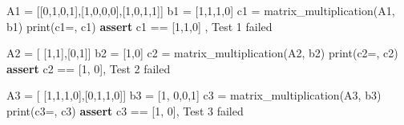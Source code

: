 \documentclass[
]{article}
\newenvironment{Shaded}{}{}
\newcommand{\BuiltInTok}[1]{\textcolor[rgb]{0.00,0.50,0.00}{#1}}
\newcommand{\ControlFlowTok}[1]{\textcolor[rgb]{0.00,0.44,0.13}{\textbf{#1}}}
\newcommand{\DecValTok}[1]{\textcolor[rgb]{0.25,0.63,0.44}{#1}}
\newcommand{\NormalTok}[1]{#1}
\newcommand{\OperatorTok}[1]{\textcolor[rgb]{0.40,0.40,0.40}{#1}}
\newcommand{\StringTok}[1]{\textcolor[rgb]{0.25,0.44,0.63}{#1}}
\begin{document}
\begin{Shaded}
\begin{Highlighting}[]
\NormalTok{A1 }\OperatorTok{=}\NormalTok{ [[}\DecValTok{0}\NormalTok{,}\DecValTok{1}\NormalTok{,}\DecValTok{0}\NormalTok{,}\DecValTok{1}\NormalTok{],[}\DecValTok{1}\NormalTok{,}\DecValTok{0}\NormalTok{,}\DecValTok{0}\NormalTok{,}\DecValTok{0}\NormalTok{],[}\DecValTok{1}\NormalTok{,}\DecValTok{0}\NormalTok{,}\DecValTok{1}\NormalTok{,}\DecValTok{1}\NormalTok{]]}
\NormalTok{b1 }\OperatorTok{=}\NormalTok{ [}\DecValTok{1}\NormalTok{,}\DecValTok{1}\NormalTok{,}\DecValTok{1}\NormalTok{,}\DecValTok{0}\NormalTok{]}
\NormalTok{c1 }\OperatorTok{=}\NormalTok{ matrix\_multiplication(A1, b1)}
\BuiltInTok{print}\NormalTok{(}\StringTok{\textquotesingle{}c1=\textquotesingle{}}\NormalTok{, c1)}
\ControlFlowTok{assert}\NormalTok{ c1 }\OperatorTok{==}\NormalTok{ [}\DecValTok{1}\NormalTok{,}\DecValTok{1}\NormalTok{,}\DecValTok{0}\NormalTok{] , }\StringTok{\textquotesingle{}Test 1 failed\textquotesingle{}}

\NormalTok{A2 }\OperatorTok{=}\NormalTok{ [ [}\DecValTok{1}\NormalTok{,}\DecValTok{1}\NormalTok{],[}\DecValTok{0}\NormalTok{,}\DecValTok{1}\NormalTok{]]}
\NormalTok{b2 }\OperatorTok{=}\NormalTok{ [}\DecValTok{1}\NormalTok{,}\DecValTok{0}\NormalTok{]}
\NormalTok{c2 }\OperatorTok{=}\NormalTok{ matrix\_multiplication(A2, b2)}
\BuiltInTok{print}\NormalTok{(}\StringTok{\textquotesingle{}c2=\textquotesingle{}}\NormalTok{, c2)}
\ControlFlowTok{assert}\NormalTok{ c2 }\OperatorTok{==}\NormalTok{ [}\DecValTok{1}\NormalTok{, }\DecValTok{0}\NormalTok{], }\StringTok{\textquotesingle{}Test 2 failed\textquotesingle{}}

\NormalTok{A3 }\OperatorTok{=}\NormalTok{ [ [}\DecValTok{1}\NormalTok{,}\DecValTok{1}\NormalTok{,}\DecValTok{1}\NormalTok{,}\DecValTok{0}\NormalTok{],[}\DecValTok{0}\NormalTok{,}\DecValTok{1}\NormalTok{,}\DecValTok{1}\NormalTok{,}\DecValTok{0}\NormalTok{]]}
\NormalTok{b3 }\OperatorTok{=}\NormalTok{  [}\DecValTok{1}\NormalTok{, }\DecValTok{0}\NormalTok{,}\DecValTok{0}\NormalTok{,}\DecValTok{1}\NormalTok{]}
\NormalTok{c3 }\OperatorTok{=}\NormalTok{ matrix\_multiplication(A3, b3)}
\BuiltInTok{print}\NormalTok{(}\StringTok{\textquotesingle{}c3=\textquotesingle{}}\NormalTok{, c3)}
\ControlFlowTok{assert}\NormalTok{ c3 }\OperatorTok{==}\NormalTok{ [}\DecValTok{1}\NormalTok{, }\DecValTok{0}\NormalTok{], }\StringTok{\textquotesingle{}Test 3 failed\textquotesingle{}}


\end{Highlighting}
\end{Shaded}
\end{document}
